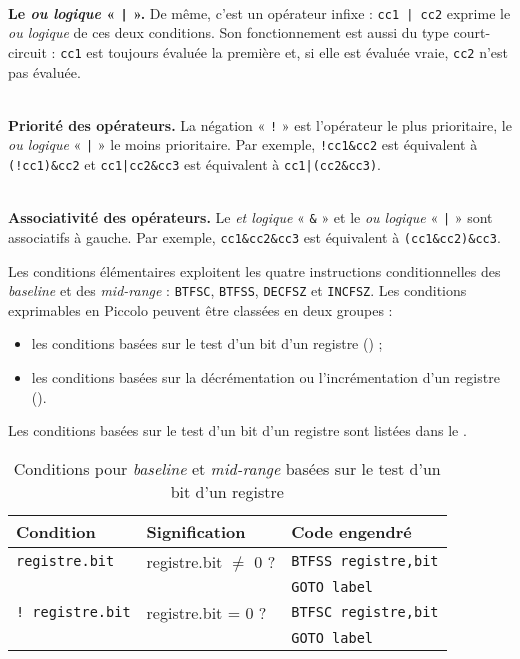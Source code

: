 ~\\
\textbf{Le \emph{ou logique} « \texttt{|} ».} De même, c'est un opérateur infixe : \texttt{cc1 | cc2} exprime le \emph{ou logique} de ces deux conditions. Son fonctionnement est aussi du type court-circuit : \texttt{cc1} est toujours évaluée la première et, si elle est évaluée vraie, \texttt{cc2} n'est pas évaluée.

~\\
\textbf{Priorité des opérateurs.} La négation « \texttt{!} » est l'opérateur le plus prioritaire, le \emph{ou logique} « \texttt{|} » le moins prioritaire. Par exemple, \texttt{!cc1\&cc2} est équivalent à \texttt{(!cc1)\&cc2} et \texttt{cc1|cc2\&cc3} est équivalent à \texttt{cc1|(cc2\&cc3)}.

~\\
\textbf{Associativité des opérateurs.} Le \emph{et logique} « \texttt{\&} » et le \emph{ou logique} « \texttt{|} » sont associatifs à gauche. Par exemple, \texttt{cc1\&cc2\&cc3} est équivalent à \texttt{(cc1\&cc2)\&cc3}.



Les conditions élémentaires exploitent les quatre instructions conditionnelles des \emph{baseline} et des \emph{mid-range} : \texttt{BTFSC}, \texttt{BTFSS}, \texttt{DECFSZ} et \texttt{INCFSZ}. Les conditions exprimables en Piccolo peuvent être classées en deux groupes :
\begin{itemize}
  \item les conditions basées sur le test d'un bit d'un registre () ;
  \item les conditions basées sur la décrémentation ou l'incrémentation d'un registre ().
\end{itemize}


Les conditions basées sur le test d'un bit d'un registre sont listées dans le .

\begin{table}[!ht]
  \centering
  \small
  \begin{tabular}{lll}
    \textbf{Condition} & \textbf{Signification} & \textbf{Code engendré}\\
    \hline
                           \texttt{registre.bit}  & registre.bit $\ne$ 0 ? &\texttt{BTFSS registre,bit}\\
                                                  &                        & \texttt{GOTO label}\\
    \rowcolor{\fondTableau}\texttt{! registre.bit}  & registre.bit = 0 ? & \texttt{BTFSC registre,bit} \\
    \rowcolor{\fondTableau}                         &                    & \texttt{GOTO label}\\
    \hline
  \end{tabular}
  \caption{Conditions pour \emph{baseline} et \emph{mid-range} basées sur le test d'un bit d'un registre}
\end{table}


